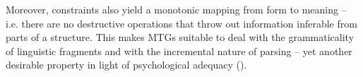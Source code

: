 \documentclass[output=paper,hidelinks]{langscibook}
\begin{document}
Moreover, constraints also yield a monotonic mapping from form to meaning -- i.e. there are no destructive operations that throw out information inferable from parts of a structure. This makes MTGs suitable to deal with the grammaticality of linguistic fragments and with the incremental nature of parsing -- yet another desirable property in light of psychological adequacy (). %

%
%

\end{document}
